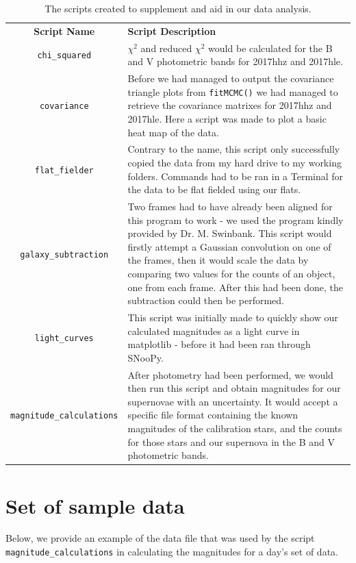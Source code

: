 \documentclass[twocolumn]{revtex4}
\begin{document}
{{{{{{\renewcommand{\arraystretch}{1.5}%
\begin{table}[h!]
\centering    
\begin{tabularx}{\textwidth}{c@{\hskip 20pt}X}
    \hline
    \textbf{Script Name} & \textbf{Script Description} \\ 
     \texttt{chi\_squared} & $\chi^2$ and reduced $\chi^2$ would be calculated for the B and V photometric bands for 2017hhz and 2017hle. \\
     \texttt{covariance} & Before we had managed to output the covariance triangle plots from \texttt{fitMCMC()} we had managed to retrieve the covariance matrixes for 2017hhz and 2017hle. Here a script was made to plot a basic heat map of the data. \\
     \texttt{flat\_fielder} & Contrary to the name, this script only successfully copied the data from my hard drive to my working folders. Commands had to be ran in a Terminal for the data to be flat fielded using our flats. \\
     \texttt{galaxy\_subtraction} & Two frames had to have already been aligned for this program to work - we used the program kindly provided by Dr. M. Swinbank. This script would firstly attempt a Gaussian convolution on one of the frames, then it would scale the data by comparing two values for the counts of an object, one from each frame. After this had been done, the subtraction could then be performed. \\
     \texttt{light\_curves} & This script was initially made to quickly show our calculated magnitudes as a light curve in matplotlib - before it had been ran through SNooPy. \\
     \texttt{magnitude\_calculations} & After photometry had been performed, we would then run this script and obtain magnitudes for our supernovae with an uncertainty. It would accept a specific file format containing the known magnitudes of the calibration stars, and the counts for those stars and our supernova in the B and V photometric bands. \\
    \hline      
\end{tabularx}
\caption{The scripts created to supplement and aid in our data analysis. }
\label{table:programs}
\end{table}

\vspace{-3ex}
\section{Set of sample data}
\vspace{-2ex}
Below, we provide an example of the data file that was used by the script \texttt{magnitude\_calculations} in calculating the magnitudes for a day's set of data.

}}}}}}
\end{document}
